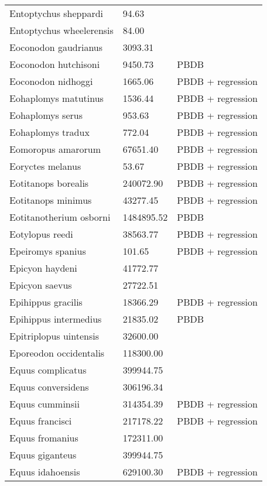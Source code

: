 \begin{center}
\begin{longtable}{p{} p{} p{} }
  Entoptychus sheppardi & 94.63 & \cite{Tomiya2013} \\ 
  Entoptychus wheelerensis & 84.00 & \cite{McKenna2011} \\ 
  Eoconodon gaudrianus & 3093.31 & \cite{Zonneveld2003} \\ 
  Eoconodon hutchisoni & 9450.73 & PBDB \\ 
  Eoconodon nidhoggi & 1665.06 & PBDB + regression \\ 
  Eohaplomys matutinus & 1536.44 & PBDB + regression \\ 
  Eohaplomys serus & 953.63 & PBDB + regression \\ 
  Eohaplomys tradux & 772.04 & PBDB + regression \\ 
  Eomoropus amarorum & 67651.40 & PBDB + regression \\ 
  Eoryctes melanus & 53.67 & PBDB + regression \\ 
  Eotitanops borealis & 240072.90 & PBDB + regression \\ 
  Eotitanops minimus & 43277.45 & PBDB + regression \\ 
  Eotitanotherium osborni & 1484895.52 & PBDB \\ 
  Eotylopus reedi & 38563.77 & PBDB + regression \\ 
  Epeiromys spanius & 101.65 & PBDB + regression \\ 
  Epicyon haydeni & 41772.77 & \cite{Tomiya2013} \\ 
  Epicyon saevus & 27722.51 & \cite{Tomiya2013} \\ 
  Epihippus gracilis & 18366.29 & PBDB + regression \\ 
  Epihippus intermedius & 21835.02 & PBDB \\ 
  Epitriplopus uintensis & 32600.00 & \cite{MacFadden1986} \\ 
  Eporeodon occidentalis & 118300.00 & \cite{McKenna2011} \\ 
  Equus complicatus & 399944.75 & \cite{Smith2004} \\ 
  Equus conversidens & 306196.34 & \cite{Smith2004} \\ 
  Equus cumminsii & 314354.39 & PBDB + regression \\ 
  Equus francisci & 217178.22 & PBDB + regression \\ 
  Equus fromanius & 172311.00 & \cite{McKenna2011} \\ 
  Equus giganteus & 399944.75 & \cite{Smith2004} \\ 
  Equus idahoensis & 629100.30 & PBDB + regression \\ 

\end{longtable}
\end{center}
